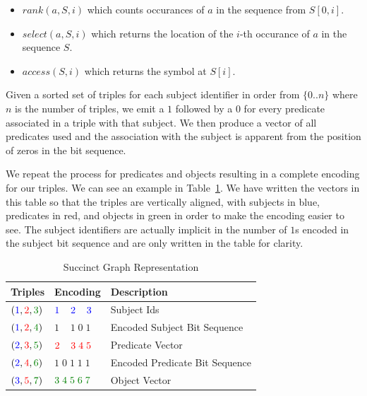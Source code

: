 \documentclass[10pt, a4paper, twocolumn]{article} %
\newcommand{\s}[1]{\textcolor{Blue}{#1}}
\newcommand{\p}[1]{\textcolor{Red}{#1}}
\newcommand{\w}[1]{\textcolor{Green}{#1}}
\begin{document}
\begin{itemize}
\item \(rank(a, S, i)\) which counts occurances of \(a\) in the sequence from \(S[0,i]\).
\item \(select(a, S, i)\) which returns the location of the \(i\)-th
  occurance of \(a\) in the sequence \(S\).
\item \(access(S, i)\) which returns the symbol at \(S[i]\).
\end{itemize}

Given a sorted set of triples for each subject identifier in order
from \(\{0..n\}\) where \(n\) is the number of triples, we emit a
\(1\) followed by a \(0\) for every predicate associated in a triple
with that subject. We then produce a vector of all predicates used and
the association with the subject is apparent from the position of
zeros in the bit sequence.

We repeat the process for predicates and objects resulting in a
complete encoding for our triples. We can see an example in
Table~\ref{tab:graph}.  We have written the vectors in this table so
that the triples are vertically aligned, with subjects in blue,
predicates in red, and objects in green in order to make the encoding
easier to see. The subject identifiers are actually implicit in the number of
\(1\)s encoded in the subject bit sequence and are only written in
the table for clarity.

\begin{table}
	\centering
	\begin{tabular}{l|l|l}
		\toprule
		Triples & Encoding & Description \\
		\midrule
        \(  (\s{1},\p{2},\w{3}) \)  & \(\s{1}\;\;\;\;\s{2} \;\;\;\;\s{3}\) & Subject Ids \\
        \(  (\s{1},\p{2},\w{4}) \)  & \(   1\;\;\;\;    1\;    0\;    1\) & Encoded Subject Bit Sequence\\
        \(  (\s{2},\p{3},\w{5}) \)  & \(\p{2}\;\;\;\;\p{3}\;\p{4}\;\p{5}\) & Predicate Vector \\
	    \(  (\s{2},\p{4},\w{6}) \)  & \(   1\;   0\;    1\;    1\;    1\) & Encoded Predicate Bit Sequence\\
	    \(  (\s{3},\p{5},\w{7}) \)  & \(\w{3}\;\w{4}\;\w{5}\;\w{6}\;\w{7}\) & Object Vector \\
		\bottomrule
	\end{tabular}
    \caption{Succinct Graph Representation}
    \label{tab:graph}
\end{table}
\end{document}
